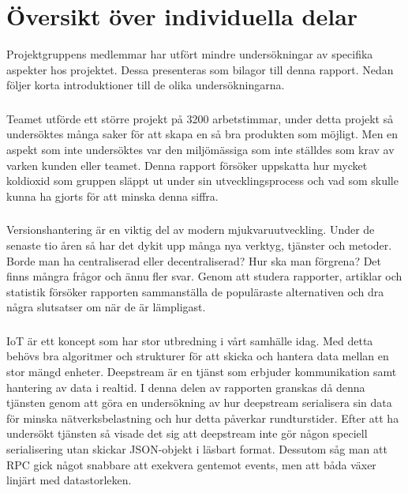 \chapter{Översikt över individuella delar}
Projektgruppens medlemmar har utfört mindre undersökningar av specifika aspekter hos projektet. Dessa presenteras som bilagor till denna rapport. Nedan följer korta introduktioner till de olika undersökningarna.

\subsection*{}
Teamet utförde ett större projekt på 3200 arbetstimmar, under detta projekt så undersöktes många saker för att skapa en så bra produkten som möjligt. Men en aspekt som inte undersöktes var den miljömässiga som inte ställdes som krav av varken kunden eller teamet. Denna rapport försöker uppskatta hur mycket koldioxid som gruppen släppt ut under sin utvecklingsprocess och vad som skulle kunna ha gjorts för att minska denna siffra.

\subsection*{}
Versionshantering är en viktig del av modern mjukvaruutveckling. Under de senaste tio åren så har det dykit upp många nya verktyg, tjänster och metoder. Borde man ha centraliserad eller decentraliserad? Hur ska man förgrena? Det finns mångra frågor och ännu fler svar. Genom att studera rapporter, artiklar och statistik försöker rapporten sammanställa de populäraste alternativen och dra några slutsatser om när de är lämpligast.

\subsection*{}
IoT är ett koncept som har stor utbredning i vårt samhälle idag. Med detta behövs bra algoritmer och strukturer för att skicka och hantera data mellan en stor mängd enheter. Deepstream är en tjänst som erbjuder kommunikation samt hantering av data i realtid. I denna delen av rapporten granskas då denna tjänsten genom att göra en undersökning av hur deepstream serialisera sin data för minska nätverksbelastning och hur detta påverkar rundturstider. Efter att ha undersökt tjänsten så visade det sig att deepstream inte gör någon speciell serialisering utan skickar JSON-objekt i läsbart format. Dessutom såg man att RPC gick något snabbare att exekvera gentemot events, men att båda växer linjärt med datastorleken.


